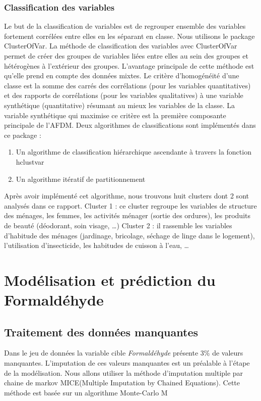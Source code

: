 \documentclass[11pt,a4paper, x11names]{article}\usepackage[]{graphicx}\usepackage[]{color}
\begin{document}
\subsubsection{Classification des variables}
Le but de la classification de variables est de regrouper ensemble des variables fortement corrélées entre elles en les séparant en classe. Nous utilisons le package ClusterOfVar. La méthode de classification des variables avec ClusterOfVar permet de créer des groupes de variables liées entre elles au sein des groupes et hétérogènes à l’extérieur des groupes. L'avantage principale de cette méthode est qu'elle prend en compte des données mixtes. Le critère d’homogénéité d’une classe est la somme des carrés des corrélations (pour les variables quantitatives) et des rapports de corrélations (pour les variables qualitatives) à une variable synthétique (quantitative) résumant au mieux les variables de la classe. La variable synthétique qui maximise ce critère est la première composante principale de l'AFDM. Deux algorithmes de classifications sont implémentés dans ce package :
\begin{enumerate}
 \item Un algorithme de classification hiérarchique ascendante à travers la fonction hclustvar 
\item Un algorithme itératif de partitionnement
\end{enumerate}
Après avoir implémenté cet algorithme, nous trouvons huit clusters dont 2 sont analysés dans ce rapport.
Cluster 1 :  ce cluster regroupe les variables de structure des ménages, les femmes, les activités ménager (sortie des ordures), les produits de beauté (déodorant, soin visage, …)
Cluster 2 : il rassemble les variables d’habitude des ménages (jardinage, bricolage, séchage de linge dans le logement), l’utilisation d’insecticide, les habitudes de cuisson à l’eau, …

\section{Modélisation et prédiction du Formaldéhyde}
\subsection{Traitement des données manquantes}
Dans le jeu de données la variable cible \textit{Formaldéhyde} présente 3\% de valeurs manquantes.
L'imputation de ces valeurs manquantes est un préalable à l'étape de la modélisation. Nous allons utiliser la méthode d'imputation multiple par chaine de markov MICE(Multiple Imputation by Chained Equations). Cette méthode est basée sur un algorithme Monte-Carlo M
\end{document}
